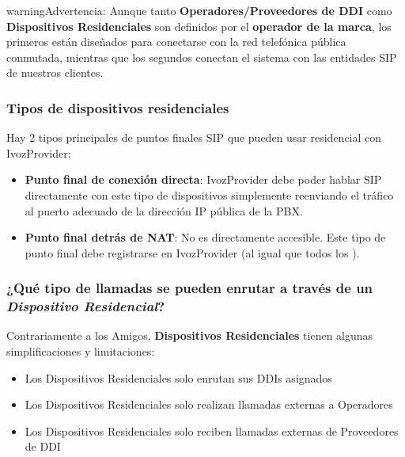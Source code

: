\documentclass[letterpaper,10pt,spanish]{sphinxmanual}
\begin{document}
\begin{notice}{warning}{Advertencia:}
Aunque tanto \textbf{Operadores/Proveedores de DDI} como \textbf{Dispositivos Residenciales} son definidos por el \textbf{operador de la marca}, los primeros están diseñados para conectarse con la red telefónica pública conmutada, mientras que los segundos conectan el sistema con las entidades SIP de nuestros clientes.
\end{notice}


\subsubsection{Tipos de dispositivos residenciales}
\label{administration_portal/client/residential/residential_devices:types-of-residential-devices}
Hay 2 tipos principales de puntos finales SIP que pueden usar residencial con IvozProvider:
\begin{itemize}
\item {} 
\textbf{Punto final de conexión directa}: IvozProvider debe poder hablar SIP directamente con este tipo de dispositivos simplemente reenviando el tráfico al puerto adecuado de la dirección IP pública de la PBX.

\item {} 
\textbf{Punto final detrás de NAT}: No es directamente accesible. Este tipo de punto final debe registrarse en IvozProvider (al igual que todos los {\hyperref[administration_portal/client/vpbx/terminals:terminals]{}}).

\end{itemize}


\subsubsection{¿Qué tipo de llamadas se pueden enrutar a través de un \emph{Dispositivo Residencial}?}
\label{administration_portal/client/residential/residential_devices:what-kind-of-calls-can-be-routed-through-a-residential-device}
Contrariamente a los Amigos, \textbf{Dispositivos Residenciales} tienen algunas simplificaciones y limitaciones:
\begin{itemize}
\item {} 
Los Dispositivos Residenciales solo enrutan sus DDIs asignados

\item {} 
Los Dispositivos Residenciales solo realizan llamadas externas a Operadores

\item {} 
Los Dispositivos Residenciales solo reciben llamadas externas de Proveedores de DDI

\end{itemize}
\end{document}
